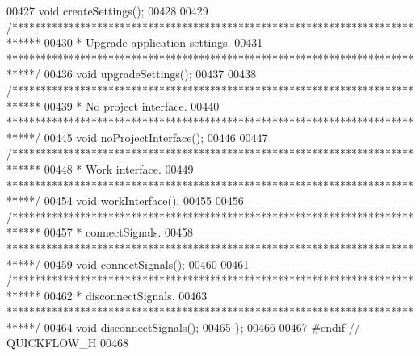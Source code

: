 \begin{DoxyCode}
00427   \textcolor{keywordtype}{void} createSettings();
00428 
00429   \textcolor{comment}{/*****************************************************************************}
00430 \textcolor{comment}{  * Upgrade application settings.}
00431 \textcolor{comment}{  *****************************************************************************/}
00436   \textcolor{keywordtype}{void} upgradeSettings();
00437 
00438   \textcolor{comment}{/*****************************************************************************}
00439 \textcolor{comment}{   * No project interface.}
00440 \textcolor{comment}{   *****************************************************************************/}
00445   \textcolor{keywordtype}{void} noProjectInterface();
00446 
00447   \textcolor{comment}{/*****************************************************************************}
00448 \textcolor{comment}{  * Work interface.}
00449 \textcolor{comment}{  *****************************************************************************/}
00454   \textcolor{keywordtype}{void} workInterface();
00455 
00456   \textcolor{comment}{/*****************************************************************************}
00457 \textcolor{comment}{  * connectSignals.}
00458 \textcolor{comment}{  *****************************************************************************/}
00459   \textcolor{keywordtype}{void} connectSignals();
00460 
00461   \textcolor{comment}{/*****************************************************************************}
00462 \textcolor{comment}{  * disconnectSignals.}
00463 \textcolor{comment}{  *****************************************************************************/}
00464   \textcolor{keywordtype}{void} disconnectSignals();
00465 \};
00466 
00467 \textcolor{preprocessor}{#endif  // QUICKFLOW\_H}
00468 
\end{DoxyCode}

